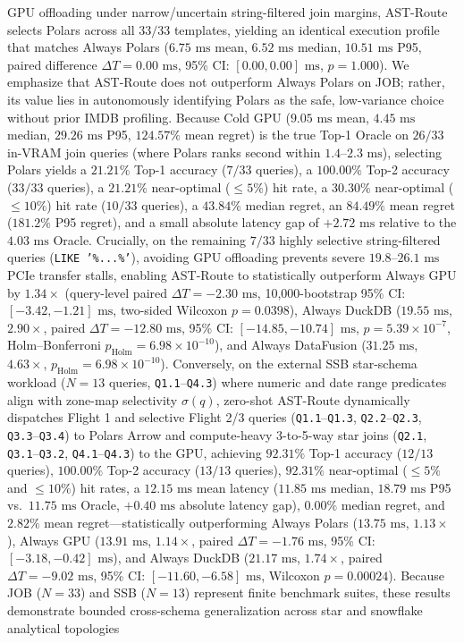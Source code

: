 \documentclass[10pt,a4paper]{article}
\begin{document}
\begin{enumerate}[leftmargin=1.5em,itemsep=2pt]
GPU offloading under narrow/uncertain string-filtered join margins, AST-Route selects Polars across all $33/33$ templates, yielding an identical execution profile that matches Always Polars ($6.75\text{ ms}$ mean, $6.52\text{ ms}$ median, $10.51\text{ ms}$ P95, paired difference $\Delta T = 0.00\text{ ms}$, 95\% CI: $[0.00, 0.00]\text{ ms}$, $p=1.000$). We emphasize that AST-Route does not outperform Always Polars on JOB; rather, its value lies in autonomously identifying Polars as the safe, low-variance choice without prior IMDB profiling. Because Cold GPU ($9.05\text{ ms}$ mean, $4.45\text{ ms}$ median, $29.26\text{ ms}$ P95, $124.57\%$ mean regret) is the true Top-1 Oracle on $26/33$ in-VRAM join queries (where Polars ranks second within $1.4\text{--}2.3\text{ ms}$), selecting Polars yields a $21.21\%$ Top-1 accuracy ($7/33$ queries), a $100.00\%$ Top-2 accuracy ($33/33$ queries), a $21.21\%$ near-optimal ($\le 5\%$) hit rate, a $30.30\%$ near-optimal ($\le 10\%$) hit rate ($10/33$ queries), a $43.84\%$ median regret, an $84.49\%$ mean regret ($181.2\%$ P95 regret), and a small absolute latency gap of $+2.72\text{ ms}$ relative to the $4.03\text{ ms}$ Oracle. Crucially, on the remaining $7/33$ highly selective string-filtered queries (\texttt{LIKE '\%...\%'}), avoiding GPU offloading prevents severe $19.8\text{--}26.1\text{ ms}$ PCIe transfer stalls, enabling AST-Route to statistically outperform Always GPU by $1.34\times$ (query-level paired $\Delta T = -2.30\text{ ms}$, 10,000-bootstrap 95\% CI: $[-3.42, -1.21]\text{ ms}$, two-sided Wilcoxon $p=0.0398$), Always DuckDB ($19.55\text{ ms}$, $2.90\times$, paired $\Delta T = -12.80\text{ ms}$, 95\% CI: $[-14.85, -10.74]\text{ ms}$, $p=5.39\times 10^{-7}$, Holm--Bonferroni $p_{\text{Holm}}=6.98\times 10^{-10}$), and Always DataFusion ($31.25\text{ ms}$, $4.63\times$, $p_{\text{Holm}}=6.98\times 10^{-10}$). Conversely, on the external SSB star-schema workload ($N=13$ queries, \texttt{Q1.1}--\texttt{Q4.3}) where numeric and date range predicates align with zone-map selectivity $\sigma(q)$, zero-shot AST-Route dynamically dispatches Flight 1 and selective Flight 2/3 queries (\texttt{Q1.1}--\texttt{Q1.3}, \texttt{Q2.2}--\texttt{Q2.3}, \texttt{Q3.3}--\texttt{Q3.4}) to Polars Arrow and compute-heavy 3-to-5-way star joins (\texttt{Q2.1}, \texttt{Q3.1}--\texttt{Q3.2}, \texttt{Q4.1}--\texttt{Q4.3}) to the GPU, achieving $92.31\%$ Top-1 accuracy ($12/13$ queries), $100.00\%$ Top-2 accuracy ($13/13$ queries), $92.31\%$ near-optimal ($\le 5\%$ and $\le 10\%$) hit rates, a $12.15\text{ ms}$ mean latency ($11.85\text{ ms}$ median, $18.79\text{ ms}$ P95 vs.\ $11.75\text{ ms}$ Oracle, $+0.40\text{ ms}$ absolute latency gap), $0.00\%$ median regret, and $2.82\%$ mean regret---statistically outperforming Always Polars ($13.75\text{ ms}$, $1.13\times$), Always GPU ($13.91\text{ ms}$, $1.14\times$, paired $\Delta T = -1.76\text{ ms}$, 95\% CI: $[-3.18, -0.42]\text{ ms}$), and Always DuckDB ($21.17\text{ ms}$, $1.74\times$, paired $\Delta T = -9.02\text{ ms}$, 95\% CI: $[-11.60, -6.58]\text{ ms}$, Wilcoxon $p=0.00024$). Because JOB ($N=33$) and SSB ($N=13$) represent finite benchmark suites, these results demonstrate bounded cross-schema generalization across star and snowflake analytical topologies 
\end{enumerate}
\end{document}
